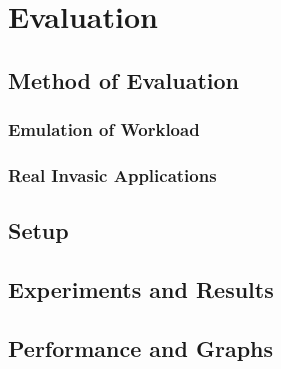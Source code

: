 \chapter{Evaluation}\label{chapter:evaluation}
\section{Method of Evaluation}
\subsection{Emulation of Workload}
\subsection{Real Invasic Applications}
\section{Setup}
\section{Experiments and Results}
\section{Performance and Graphs}
